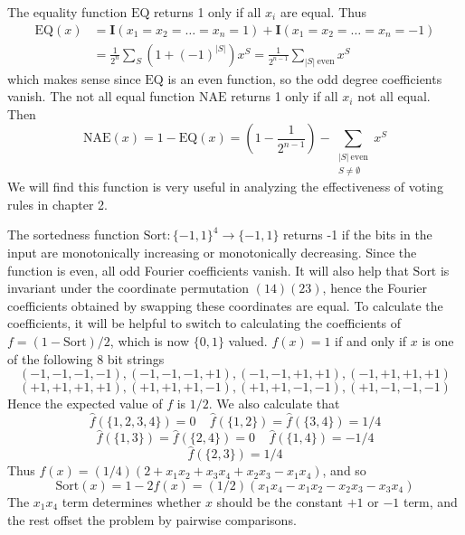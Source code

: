 \begin{example}
    The equality function $\text{EQ}$ returns 1 only if all $x_i$ are equal. Thus
    \begin{align*}
        \text{EQ}(x) &= \mathbf{I}(x_1 = x_2 = \dots = x_n = 1) + \mathbf{I}(x_1 = x_2 = \dots = x_n = -1)\\
        &= \frac{1}{2^n} \sum_S (1 + (-1)^{|S|}) x^S = \frac{1}{2^{n-1}} \sum_{|S|\ \text{even}} x^S
    \end{align*}
    which makes sense since $\text{EQ}$ is an even function, so the odd degree coefficients vanish. The not all equal function $\text{NAE}$ returns 1 only if all $x_i$ not all equal. Then
    \[ \text{NAE}(x) = 1 - \text{EQ}(x) = \left( 1 - \frac{1}{2^{n-1}} \right) - \sum_{\substack{|S|\ \text{even}\\S \neq \emptyset}} x^S \]
    We will find this function is very useful in analyzing the effectiveness of voting rules in chapter 2.
\end{example}

\begin{example}
    The sortedness function $\text{Sort} : \{ -1, 1 \}^4 \to \{ -1, 1 \}$ returns -1 if the bits in the input are monotonically increasing or monotonically decreasing. Since the function is even, all odd Fourier coefficients vanish. It will also help that $\text{Sort}$ is invariant under the coordinate permutation $(1 4)(2 3)$, hence the Fourier coefficients obtained by swapping these coordinates are equal. To calculate the coefficients, it will be helpful to switch to calculating the coefficients of $f = (1 - \text{Sort})/2$, which is now $\{ 0, 1 \}$ valued. $f(x) = 1$ if and only if $x$ is one of the following 8 bit strings
    \[ (-1,-1,-1,-1), (-1,-1,-1,+1), (-1,-1,+1,+1), (-1,+1,+1,+1) \]
    \[ (+1,+1,+1,+1), (+1,+1,+1,-1), (+1,+1,-1,-1), (+1,-1,-1,-1) \]
    Hence the expected value of $f$ is $1/2$. We also calculate that
    \[ \widehat{f}(\{1,2,3,4\}) = 0\ \ \ \ \ \widehat{f}(\{1,2\}) = \widehat{f}(\{3,4\}) = 1/4 \]
    \[ \widehat{f}(\{ 1, 3 \}) = \widehat{f}(\{2,4\}) = 0\ \ \ \ \ \widehat{f}(\{1,4\}) = -1/4 \]
    \[ \widehat{f}(\{2,3\}) = 1/4 \]
    Thus $f(x) = (1/4)(2 + x_1x_2 + x_3x_4 + x_2x_3 - x_1x_4)$, and so
    \[ \text{Sort}(x) = 1 - 2f(x) = (1/2)(x_1x_4 - x_1x_2 - x_2x_3 - x_3x_4) \]
    The $x_1x_4$ term determines whether $x$ should be the constant $+1$ or $-1$ term, and the rest offset the problem by pairwise comparisons.
\end{example}

